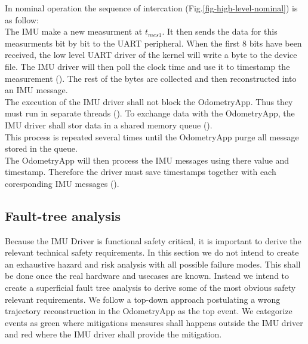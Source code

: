 In nominal operation the sequence of intercation (Fig.\ref{fig-high-level-nominal}) is as follow:\\
The IMU make a new measurment at $t_{mes1}$.
It then sends the data for this measurments bit by bit to the UART peripheral.
When the first 8 bits have been received, the low level UART driver of the kernel will write a byte to the device file.
The IMU driver will then poll the clock time and use it to timestamp the measurement ().
The rest of the bytes are collected and then reconstructed into an IMU message.\\
The execution of the IMU driver shall not block the OdometryApp. Thus they must run in separate threads ().
To exchange data with the OdometryApp, the IMU driver shall stor data in a shared memory queue ().\\
This process is repeated several times until the OdometryApp purge all message stored in the queue.\\
The OdometryApp will then process the IMU messages using there value and timestamp.
Therefore the driver must save timestamps together with each coresponding IMU messages ().

\subsection{Fault-tree analysis}
Because the IMU Driver is functional safety critical, it is important to derive the relevant technical safety requirements.
In this section we do not intend to create an exhaustive hazard and risk analysis with all possible failure modes.
This shall be done once the real hardware and usecases are known.
Instead we intend to create a superficial fault tree analysis to derive some of the most obvious safety relevant requirements.
We follow a top-down approach postulating a wrong trajectory reconstruction in the OdometryApp as the top event.
We categorize events as green where mitigations measures shall happens outside the IMU driver and red where the IMU driver shall provide the mitigation.

